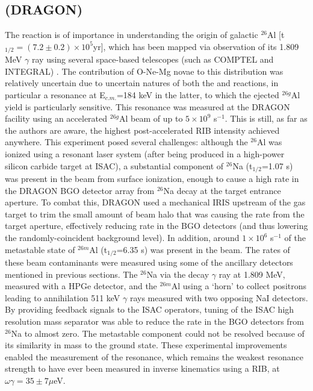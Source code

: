 \subsection{ (DRAGON)}
The  reaction is of importance in understanding the origin of galactic $^{26}$Al [t$_{1/2}=(7.2\pm0.2)\times10^{5}$yr], which has been mapped via observation of its 1.809 MeV $\gamma$ ray using several space-based telescopes (such as COMPTEL and INTEGRAL) \cite{smi03,kno04,die95}. The contribution of O-Ne-Mg novae to this distribution was relatively uncertain due to uncertain natures of both the  and  reactions, in particular a resonance at E$_{c.m.}$=184 keV in the latter, to which the ejected $^{26g}$Al yield is particularly sensitive. This resonance was measured \cite{rui06} at the DRAGON facility using an accelerated $^{26g}$Al beam of up to $5\times10^{9}$ s$^{-1}$. This is still, as far as the authors are aware, the highest post-accelerated RIB intensity achieved anywhere. This experiment posed several challenges: although the $^{26}$Al was ionized using a resonant laser system (after being produced in a high-power silicon carbide target at ISAC), a substantial component of $^{26}$Na (t$_{1/2}$=1.07 s) was present in the beam from surface ionization, enough to cause a high rate in the DRAGON BGO detector array from $^{26}$Na decay at the target entrance aperture. To combat this, DRAGON used  a mechanical IRIS upstream of the gas target to trim the small amount of beam halo that was causing the rate from the target aperture, effectively reducing rate in the BGO detectors (and thus lowering the randomly-coincident background level). In addition, around $1\times10^{6}$ s$^{-1}$ of the metastable state of $^{26m}$Al (t$_{1/2}$=6.35 s) was present in the beam. The rates of these beam contaminants were measured using some of the ancillary detectors mentioned in previous sections. The $^{26}$Na via the decay $\gamma$ ray at 1.809 MeV, measured with a HPGe detector, and the $^{26m}$Al using a `horn' to collect positrons leading to annihilation 511 keV $\gamma$ rays measured with two opposing NaI detectors. By providing feedback signals to the ISAC operators, tuning of the ISAC high resolution mass separator was able to reduce the rate in the BGO detectors from $^{26}$Na to almost zero. The metastable component could not be resolved because of its similarity in mass to the ground state. 
These experimental improvements enabled the measurement of the resonance, which remains the weakest resonance strength to have ever been measured in inverse kinematics using a RIB, at $\omega\gamma=35\pm7 \mu$eV. 

